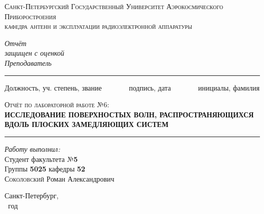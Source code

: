 \newcommand{\HRule}{\rule{\linewidth}{0.5mm}}
\begin{titlepage}
\begin{center}
\textsc{\large Санкт-Петербургский Государственный
Университет Аэрокосмического Приборостроения}\\[2cm]
\textsc{\large кафедра антенн и эксплуатации радиоэлектронной 
 аппаратуры}
\\[2cm]

 \begin{flushleft} \large
  \emph{Отчёт} \\
   \emph{защищен с оценкой}
   \\[0.5cm]
   \emph{Преподаватель}\\[-3mm]
   \HRule
\end{flushleft}
\begin{flushright}
\vspace{-6 pt}
{\small
Должность, уч. степень, звание
\ \ \ \ \ \ \
подпись, дата
\ \ \ \ \ \ \
инициалы, фамилия }\\[10mm]
\end{flushright}

\textsc{\Large Отчёт по лабораторной работе №6:} \\[1cm]
{\Large \bfseries ИССЛЕДОВАНИЕ ПОВЕРХНОСТЫХ ВОЛН,
РАСПРОСТРАНЯЮЩИХСЯ ВДОЛЬ ПЛОСКИХ ЗАМЕДЛЯЮЩИХ СИСТЕМ}\\[1cm]

\HRule
\vspace{5 pt}
\begin{flushright}
    \begin{minipage}{0.5\textwidth}
        \begin{flushright} 
            \large
            \emph{Работу выполнил:}\\
            Студент факультета №\textbf{5}\\
            Группы \textbf{5025} кафедры \textbf{52}\\[2pt]
            \textsc{Соколовский} \textsc{Р}оман \textsc{А}лександрович
        \end{flushright}
    \end{minipage}
\end{flushright}

\vfill
Санкт-Петербург,\\
\the\year~год
\end{center}
\end{titlepage}
